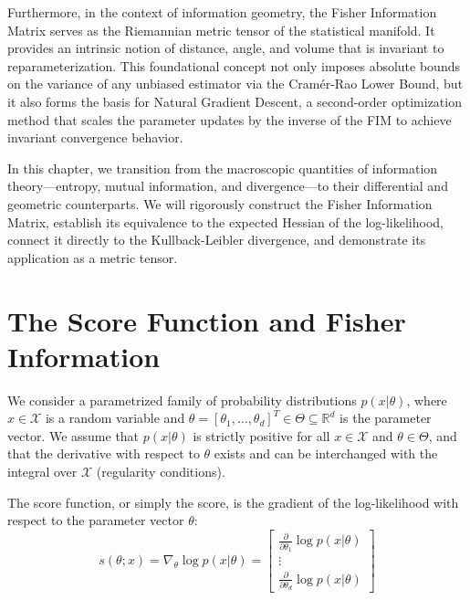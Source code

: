 Furthermore, in the context of information geometry, the Fisher Information Matrix serves as the Riemannian metric tensor of the statistical manifold. It provides an intrinsic notion of distance, angle, and volume that is invariant to reparameterization. This foundational concept not only imposes absolute bounds on the variance of any unbiased estimator via the Cramér-Rao Lower Bound, but it also forms the basis for Natural Gradient Descent, a second-order optimization method that scales the parameter updates by the inverse of the FIM to achieve invariant convergence behavior.

In this chapter, we transition from the macroscopic quantities of information theory---entropy, mutual information, and divergence---to their differential and geometric counterparts. We will rigorously construct the Fisher Information Matrix, establish its equivalence to the expected Hessian of the log-likelihood, connect it directly to the Kullback-Leibler divergence, and demonstrate its application as a metric tensor. 

\section{The Score Function and Fisher Information}

We consider a parametrized family of probability distributions $p(x|\theta)$, where $x \in \mathcal{X}$ is a random variable and $\theta = [\theta_1, \dots, \theta_d]^T \in \Theta \subseteq \mathbb{R}^d$ is the parameter vector. We assume that $p(x|\theta)$ is strictly positive for all $x \in \mathcal{X}$ and $\theta \in \Theta$, and that the derivative with respect to $\theta$ exists and can be interchanged with the integral over $\mathcal{X}$ (regularity conditions).

\begin{definition}
The score function, or simply the score, is the gradient of the log-likelihood with respect to the parameter vector $\theta$:
\begin{equation}
    s(\theta; x) = \nabla_\theta \log p(x|\theta) = \begin{bmatrix}
        \frac{\partial}{\partial \theta_1} \log p(x|\theta) \\
        \vdots \\
        \frac{\partial}{\partial \theta_d} \log p(x|\theta)
    \end{bmatrix}
\end{equation}
\end{definition}

